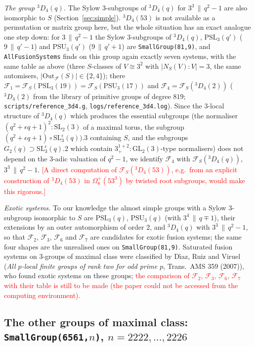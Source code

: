\documentclass[11pt]{article}
\theoremstyle{definition}
\theoremstyle{remark}
\newcommand{\F}{\mathcal{F}}
\newcommand{\Out}{\mathrm{Out}}
\newcommand{\GL}{\mathrm{GL}}
\newcommand{\SL}{\mathrm{SL}}
\newcommand{\PSL}{\mathrm{PSL}}
\newcommand{\PSU}{\mathrm{PSU}}
\begin{document}
\emph{The group ${}^3D_4(q)$.}  The Sylow $3$-subgroups of ${}^3D_4(q)$ for
$3^3\,\|\,q^2-1$ are also isomorphic to $S$ (Section~\ref{sec:simple}).
${}^3D_4(53)$ is not available as a permutation or matrix group here, but
the whole situation has an exact analogue one step down: for $3\,\|\,q^2-1$
the Sylow $3$-subgroups of ${}^3D_4(q)$, $\PSL_3(q')$ ($9\,\|\,q'-1$) and
$\PSU_3(q')$ ($9\,\|\,q'+1$) are \texttt{SmallGroup(81,9)}, and
\texttt{AllFusionSystems} finds on this group again exactly seven systems,
with the same table as above (three $S$-classes of $V\cong3^2$ with
$|N_S(V):V|=3$, the same automisers, $|\Out_\F(S)|\in\{2,4\}$); there
$\F_1=\F_S(\PSL_3(19))=\F_S(\PSU_3(17))$ and
$\F_4=\F_S({}^3D_4(2))$ (${}^3D_4(2)$ from the library of primitive groups of
degree $819$; \texttt{scripts/reference\_3d4.g},
\texttt{logs/reference\_3d4.log}).  Since the $3$-local structure of
${}^3D_4(q)$ which produces the essential subgroups (the normaliser
$(q^2+\epsilon q+1)^2{:}\SL_2(3)$ of a maximal torus, the subgroup
$(q^2+\epsilon q+1)\circ\SL_3^\epsilon(q)).3$ containing $S$, and the
subgroups $G_2(q)\supset\SL_3^\epsilon(q).2$ which contain
$3^{1+2}_+{:}\GL_2(3)$-type normalisers) does not depend on the
$3$-adic valuation of $q^2-1$, we identify $\F_4$ with
$\F_S({}^3D_4(q))$, $3^3\,\|\,q^2-1$.  \textcolor{red}{[A direct
computation of $\F_S({}^3D_4(53))$, e.g.\ from an explicit construction of
${}^3D_4(53)$ in $\Omega_8^+(53^3)$ by twisted root subgroups, would make
this rigorous.]}

\emph{Exotic systems.}  To our knowledge the almost simple groups with a
Sylow $3$-subgroup isomorphic to $S$ are $\PSL_3(q)$, $\PSU_3(q)$ (with
$3^4\,\|\,q\mp1$), their extensions by an outer automorphism of order
$2$, and ${}^3D_4(q)$ with $3^3\,\|\,q^2-1$, so that $\F_2$, $\F_3$, $\F_6$
and $\F_7$ are candidates for exotic fusion systems; the same four shapes
are the unrealised ones on \texttt{SmallGroup(81,9)}.  Saturated fusion
systems on $3$-groups of maximal class were classified by D\'{\i}az, Ruiz
and Viruel (\emph{All $p$-local finite groups of rank two for odd prime
$p$}, Trans.\ AMS 359 (2007)), who found exotic systems on these groups;
\textcolor{red}{the comparison of $\F_2$, $\F_3$, $\F_6$, $\F_7$ with their
table is still to be made (the paper could not be accessed from the
computing environment).}

\subsection{The other groups of maximal class: \texttt{SmallGroup(6561,}$n$\texttt{)}, $n=2222,\dots,2226$}
\label{sec:2225}
\end{document}
